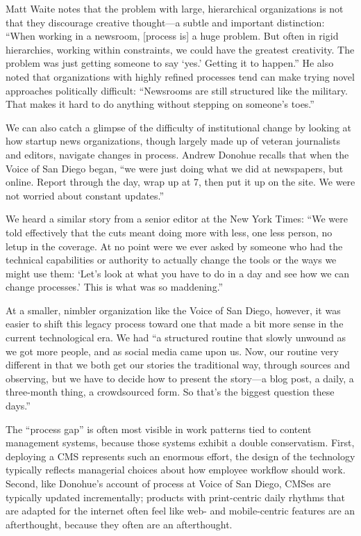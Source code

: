 Matt Waite notes that the problem with large, hierarchical organizations is not
that they discourage creative thought—a subtle and important distinction:
``When working in a newsroom, [process is] a huge problem. But often in rigid
hierarchies, working within constraints, we could have the greatest creativity.
The problem was just getting someone to say ‘yes.’ Getting it to happen.'' He
also noted that organizations with highly refined processes tend can make trying
novel approaches politically difficult: ``Newsrooms are still structured like the
military. That makes it hard to do anything without stepping on someone’s toes.''

We can also catch a glimpse of the difficulty of institutional change by looking
at how startup news organizations, though largely made up of veteran journalists
and editors, navigate changes in process. Andrew Donohue recalls that when the Voice of San Diego began, ``we were just doing what we did at newspapers, but
online. Report through the day, wrap up at 7, then put it up on the site. We were
not worried about constant updates.''

We heard a similar story from a senior editor at the New York Times: ``We were
told effectively that the cuts meant doing more with less, one less person, no
letup in the coverage. At no point were we ever asked by someone who had the
technical capabilities or authority to actually change the tools or the ways we
might use them: ‘Let’s look at what you have to do in a day and see how we can
change processes.’ This is what was so maddening.''

At a smaller, nimbler organization like the Voice of San Diego, however, it was
easier to shift this legacy process toward one that made a bit more sense in the
current technological era. We had ``a structured routine that slowly unwound
as we got more people, and as social media came upon us. Now, our routine
very different in that we both get our stories the traditional way, through
sources and observing, but we have to decide how to present the story—a blog
post, a daily, a three-month thing, a crowdsourced form. So that’s the biggest
question these days.''

The ``process gap'' is often most visible in work patterns tied to content management
systems, because those systems exhibit a double conservatism. First,
deploying a CMS represents such an enormous effort, the design of the technology
typically reflects managerial choices about how employee workflow should
work. Second, like Donohue’s account of process at Voice of San Diego, CMSes
are typically updated incrementally; products with print-centric daily rhythms
that are adapted for the internet often feel like web- and mobile-centric features
are an afterthought, because they often are an afterthought.

